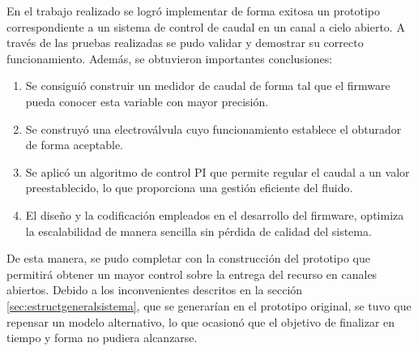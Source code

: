 %
En el trabajo realizado se logró implementar de forma exitosa un prototipo correspondiente a un sistema de control de caudal en un canal a cielo abierto.
A través de las pruebas realizadas se pudo validar y demostrar su correcto funcionamiento. Además, se obtuvieron importantes conclusiones:
\begin{enumerate}
\item Se consiguió construir un medidor de caudal de forma tal que el firmware pueda conocer esta variable con mayor precisión.
\item Se construyó una electroválvula cuyo funcionamiento establece el obturador de forma aceptable.      
\item Se aplicó un algoritmo de control PI que permite regular el caudal a un valor preestablecido, lo que proporciona una gestión eficiente del fluido. 
\item El diseño y la codificación empleados en el desarrollo del firmware, optimiza la escalabilidad de manera sencilla sin pérdida de calidad del sistema.

\end{enumerate}
De esta manera, se pudo completar con la construcción del prototipo que permitirá obtener un mayor control sobre la entrega del recurso en canales abiertos.
Debido a los inconvenientes descritos en la sección \ref{sec:estructgeneralsistema}, que se generarían en el prototipo original, se tuvo que repensar un modelo alternativo, lo que ocasionó que el objetivo de finalizar en tiempo y forma no pudiera alcanzarse. 

